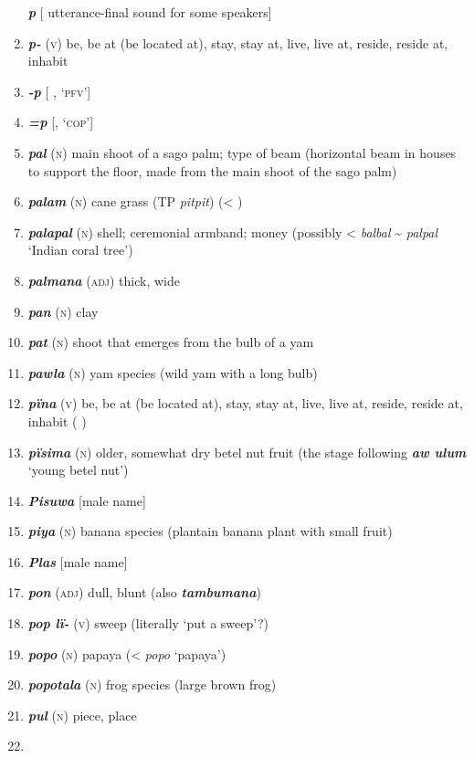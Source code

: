 \begin{enumerate}[noitemsep, label={}, align=left, widest=190, labelsep=1ex,leftmargin=*,itemindent=-10pt]
\textbf{\textit{p}} [ utterance-final sound for some speakers] \item 
\textbf{\textit{p-}} (\textsc{v}) be, be at (be located at), stay, stay at, live, live at, reside, reside at, inhabit \item 
\textbf{\textit{-p}} [ , ‘\textsc{pfv}’] \item 
\textbf{\textit{=p}} [, ‘\textsc{cop}’] \item 
\textbf{\textit{pal}} (\textsc{n}) main shoot of a sago palm; type of beam  (horizontal beam in houses to \linebreak support the floor, made from the main shoot of the sago palm) \item 
\textbf{\textit{palam}} (\textsc{n}) cane grass (TP \textit{pitpit}) (< ) \item 
\textbf{\textit{palapal}} (\textsc{n}) shell; ceremonial armband; money (possibly <  \textit{balbal} {\textasciitilde} \textit{palpal} ‘Indian coral tree’) \item 
\textbf{\textit{palmana}} (\textsc{adj}) thick, wide \item 
\textbf{\textit{pan}} (\textsc{n}) clay \item 
\textbf{\textit{pat}} (\textsc{n}) shoot that emerges from the bulb of a yam \item 
\textbf{\textit{pawla}} (\textsc{n}) yam species (wild yam with a long bulb) \item 
\textbf{\textit{pïna}} (\textsc{v}) be, be at (be located at), stay, stay at, live, live at, reside, reside at, inhabit ( ) \item 
\textbf{\textit{pïsima}} (\textsc{n}) older, somewhat dry betel nut fruit (the stage following \textbf{\textit{aw ulum}} ‘young betel nut’) \item 
\textbf{\textit{Pisuwa}} [male name] \item 
\textbf{\textit{piya}} (\textsc{n}) banana species (plantain banana plant with small fruit) \item 
\textbf{\textit{Plas}} [male name] \item 
\textbf{\textit{pon}} (\textsc{adj}) dull, blunt (also \textit{\textbf{tambumana}}) \item 
\textbf{\textit{pop lï-}} (\textsc{v}) sweep (literally ‘put a sweep’?) \item 
\textbf{\textit{popo}} (\textsc{n}) papaya (<  \textit{popo} ‘papaya’) \item 
\textbf{\textit{popotala}} (\textsc{n}) frog species (large brown frog) \item 
\textbf{\textit{pul}} (\textsc{n}) piece, place\\ \item 


\end{enumerate}
